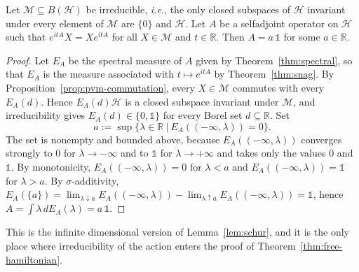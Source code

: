 \begin{lemma}\label{lem:schur-infinite}
	Let $\mathcal{M}\subseteq B(\mathcal{H})$ be irreducible, \textit{i.e.}, the only closed subspaces of $\mathcal{H}$ invariant under every element of $\mathcal{M}$ are $\{0\}$ and $\mathcal{H}$. Let $A$ be a selfadjoint operator on $\mathcal{H}$ such that $e^{itA}X=Xe^{itA}$ for all $X\in\mathcal{M}$ and $t\in\mathbb{R}$. Then $A=a\,\mathbb{1}$ for some $a\in\mathbb{R}$.
\end{lemma}

\begin{proof}
	Let $E_A$ be the spectral measure of $A$ given by Theorem~\ref{thm:spectral}, so that $E_A$ is the measure associated with $t\mapsto e^{itA}$ by Theorem~\ref{thm:snag}. By Proposition~\ref{prop:pvm-commutation}, every $X\in\mathcal{M}$ commutes with every $E_A(d)$. Hence $E_A(d)\mathcal{H}$ is a closed subspace invariant under $\mathcal{M}$, and irreducibility gives $E_A(d)\in\{0,\mathbb{1}\}$ for every Borel set $d\subseteq\mathbb{R}$. Set
	\begin{equation*}
		a:=\sup\big\{\lambda\in\mathbb{R}\ \big|\ E_A((-\infty,\lambda))=0\big\}.
	\end{equation*}
	The set is nonempty and bounded above, because $E_A((-\infty,\lambda))$ converges strongly to $0$ for $\lambda\to-\infty$ and to $\mathbb{1}$ for $\lambda\to+\infty$ and takes only the values $0$ and $\mathbb{1}$. By monotonicity, $E_A((-\infty,\lambda))=0$ for $\lambda<a$ and $E_A((-\infty,\lambda))=\mathbb{1}$ for $\lambda>a$. By $\sigma$-additivity, $E_A(\{a\})=\lim_{\lambda\downarrow a}E_A((-\infty,\lambda))-\lim_{\lambda\uparrow a}E_A((-\infty,\lambda))=\mathbb{1}$, hence $A=\int\lambda\,dE_A(\lambda)=a\,\mathbb{1}$.
\end{proof}

\noindent This is the infinite dimensional version of Lemma~\ref{lem:schur}, and it is the only place where irreducibility of the action enters the proof of Theorem~\ref{thm:free-hamiltonian}.

